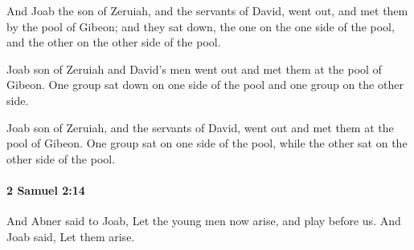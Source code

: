 			\begin{versebox}
					\item[BHS] 
					\item[ASV] And Joab the son of Zeruiah, and the servants of David, went out, and met them by the pool of Gibeon; and they sat down, the one on the one side of the pool, and the other on the other side of the pool.
					\item[NIV] Joab son of Zeruiah and David’s men went out and met them at the pool of Gibeon. One group sat down on one side of the pool and one group on the other side.
					\item[NRSV] Joab son of Zeruiah, and the servants of David, went out and met them at the pool of Gibeon. One group sat on one side of the pool, while the other sat on the other side of the pool.
			\end{versebox}

		\paragraph{2 Samuel 2:14} %
			\label{2SAMUEL-2-14}

			And Abner said to Joab, Let the young men now arise, and play before us. And Joab said, Let them arise.


